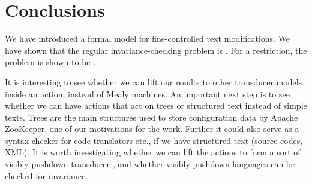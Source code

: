 
\section{Conclusions}\label{sec:c03-conclusions}

We have introduced a formal model for fine-controlled text modifications. We have shown that the regular invariance-checking problem is \pspc. For a restriction, the problem is shown to be \conpc.

It is interesting to see whether we can lift our results to other transducer models inside an action, instead of Mealy machines. An important next step is to see whether we can have actions that act on trees or structured text instead of simple texts. Trees are the main structures used to store configuration data by Apache ZooKeeper, one of our motivations for the work. Further it could also serve as a syntax checker for code translators etc., if we have structured text (source codes, XML). It is worth investigating whether we can lift the actions to form a sort of  visibly pushdown transducer \cite{FRRST2018}, and whether visibly pushdown languages \cite{AM2004} can be checked for invariance.
